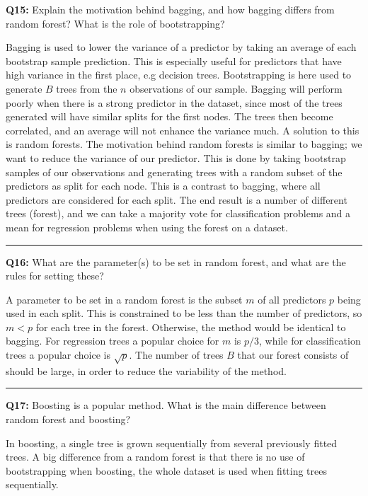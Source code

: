 \documentclass[]{article}
\begin{document}
\textbf{Q15:} Explain the motivation behind bagging, and how bagging
differs from random forest? What is the role of bootstrapping?

Bagging is used to lower the variance of a predictor by taking an
average of each bootstrap sample prediction. This is especially useful
for predictors that have high variance in the first place, e.g decision
trees. Bootstrapping is here used to generate \(B\) trees from the \(n\)
observations of our sample. Bagging will perform poorly when there is a
strong predictor in the dataset, since most of the trees generated will
have similar splits for the first nodes. The trees then become
correlated, and an average will not enhance the variance much. A
solution to this is random forests. The motivation behind random forests
is similar to bagging; we want to reduce the variance of our predictor.
This is done by taking bootstrap samples of our observations and
generating trees with a random subset of the predictors as split for
each node. This is a contrast to bagging, where all predictors are
considered for each split. The end result is a number of different trees
(forest), and we can take a majority vote for classification problems
and a mean for regression problems when using the forest on a dataset.

\begin{center}\rule{0.5\linewidth}{\linethickness}\end{center}

\textbf{Q16:} What are the parameter(s) to be set in random forest, and
what are the rules for setting these?

A parameter to be set in a random forest is the subset \(m\) of all
predictors \(p\) being used in each split. This is constrained to be
less than the number of predictors, so \(m < p\) for each tree in the
forest. Otherwise, the method would be identical to bagging. For
regression trees a popular choice for \(m\) is \(p/3\), while for
classification trees a popular choice is \(\sqrt{p}\). The number of
trees \(B\) that our forest consists of should be large, in order to
reduce the variability of the method.

\begin{center}\rule{0.5\linewidth}{\linethickness}\end{center}

\textbf{Q17:} Boosting is a popular method. What is the main difference
between random forest and boosting?

In boosting, a single tree is grown sequentially from several previously
fitted trees. A big difference from a random forest is that there is no
use of bootstrapping when boosting, the whole dataset is used when
fitting trees sequentially.
\end{document}
